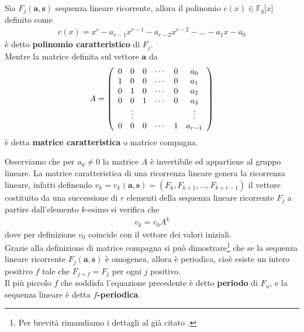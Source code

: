 \begin{definizione}
   Sia $F_{j}(\mathbf{a},\mathbf{s}) $ sequenza lineare ricorrente, allora il polinomio $c(x) \in \mathbb{F}_{q}\lbrack x \rbrack$ definito come
   \begin{align*}
      c(x)= x^{r} - a_{r-1}x^{r-1} - a_{r-2}x^{r-2} - \dots - a_{1}x - a_{0}
   \end{align*}
   è detto {\bf polinomio caratteristico} di $F_{j}$. \\
   Mentre la matrice definita sul vettore $\mathbf{a}$ da
   \begin{align*}
      A =
      \left(
      \begin{array} {c c c c c c}
      0 & 0 & 0 & \cdots & 0 & a_{0}    \\
      1 & 0 & 0 & \cdots & 0 & a_{1}    \\
      0 & 1 & 0 & \cdots & 0 & a_{2}    \\
      0 & 0 & 1 & \cdots & 0 & a_{3}    \\
       & \vdots  &  &  &  & \vdots    \\
      0 & 0 & 0 & \cdots & 1 & a_{r-1}    \\
      \end{array}
      \right)
    \end{align*}
    è detta {\bf matrice caratteristica} o matrice compagna.
\end{definizione}
Osserviamo che per $a_{0} \neq 0$ la matrice $A$ è invertibile ed appartiene al gruppo lineare.
La matrice caratteristica di una ricorrenza lineare genera la ricorrenza lineare, infatti definendo $v_{k} = v_{k}(\mathbf{a},\mathbf{s}) = (F_{k}, F_{k+1}, \dots , F_{k+r-1})$ il vettore costituito da una successione di $r$ elementi della sequenza lineare ricorrente $F_{j}$ a partire dall'elemento $k$-esimo si verifica che
\begin{align*}
  v_{k} = v_{0}A^{k}
\end{align*}
dove per definizione $v_{0}$ coincide con il vettore dei valori iniziali.\\
Grazie alla definizione di matrice compagna si può dimostrare\footnote{Per brevità rimandiamo i dettagli al già citato \cite{lidl}. } che se la sequenza lineare ricorrente $F_{j}(\mathbf{a},\mathbf{s}) $ è omogenea, allora è periodica, cioè esiste un intero positivo $f$ tale che $F_{j+f} = F_{j}$ per ogni $j$ positivo. \\
Il più piccolo $f$ che soddisfa l'equazione precedente è detto {\bf periodo} di $F_{n}$, e la sequenza lineare è detta {\bf $f$-periodica}.
